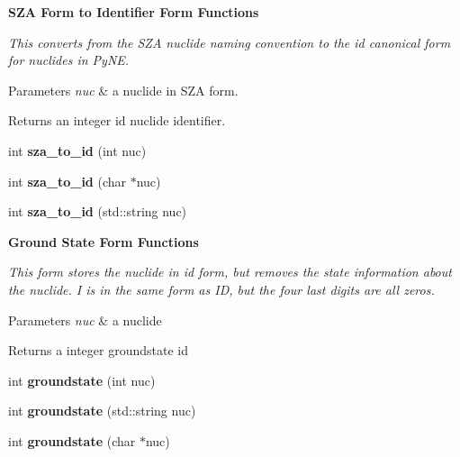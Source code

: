 \begin{Indent}{\bf S\-Z\-A Form to Identifier Form Functions}\par
{\em This converts from the S\-Z\-A nuclide naming convention to the id canonical form for nuclides in Py\-N\-E. 
\begin{DoxyParams}{Parameters}
{\em nuc} & a nuclide in S\-Z\-A form. \\
\hline
\end{DoxyParams}
\begin{DoxyReturn}{Returns}
an integer id nuclide identifier. 
\end{DoxyReturn}
}\begin{DoxyCompactItemize}
\item 
\hypertarget{namespacepyne_1_1nucname_a2d97b24683f8a35a3ab716807fbfccbc}{int {\bfseries sza\-\_\-to\-\_\-id} (int nuc)}\label{namespacepyne_1_1nucname_a2d97b24683f8a35a3ab716807fbfccbc}

\item 
\hypertarget{namespacepyne_1_1nucname_a6e1172966c9e7fd48fc9d5134a674890}{int {\bfseries sza\-\_\-to\-\_\-id} (char $\ast$nuc)}\label{namespacepyne_1_1nucname_a6e1172966c9e7fd48fc9d5134a674890}

\item 
\hypertarget{namespacepyne_1_1nucname_af4d6093c95bb523de10c8c6bb93224aa}{int {\bfseries sza\-\_\-to\-\_\-id} (std\-::string nuc)}\label{namespacepyne_1_1nucname_af4d6093c95bb523de10c8c6bb93224aa}

\end{DoxyCompactItemize}
\end{Indent}
\begin{Indent}{\bf Ground State Form Functions}\par
{\em This form stores the nuclide in id form, but removes the state information about the nuclide. I is in the same form as I\-D, but the four last digits are all zeros. 
\begin{DoxyParams}{Parameters}
{\em nuc} & a nuclide \\
\hline
\end{DoxyParams}
\begin{DoxyReturn}{Returns}
a integer groundstate id 
\end{DoxyReturn}
}\begin{DoxyCompactItemize}
\item 
\hypertarget{namespacepyne_1_1nucname_a81937700730c53c357f2902b9f7efa15}{int {\bfseries groundstate} (int nuc)}\label{namespacepyne_1_1nucname_a81937700730c53c357f2902b9f7efa15}

\item 
\hypertarget{namespacepyne_1_1nucname_a1cc9dcbea2e73a8ffffed55fecff9766}{int {\bfseries groundstate} (std\-::string nuc)}\label{namespacepyne_1_1nucname_a1cc9dcbea2e73a8ffffed55fecff9766}

\item 
\hypertarget{namespacepyne_1_1nucname_a363ed4d7a830a42161630743650a0d39}{int {\bfseries groundstate} (char $\ast$nuc)}\label{namespacepyne_1_1nucname_a363ed4d7a830a42161630743650a0d39}

\end{DoxyCompactItemize}
\end{Indent}
